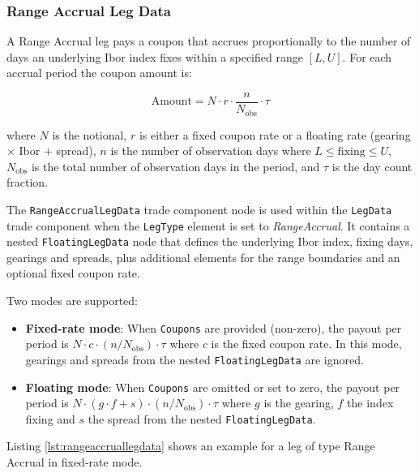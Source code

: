 \subsubsection{Range Accrual Leg Data}
\label{ss:rangeaccruallegdata}

A Range Accrual leg pays a coupon that accrues proportionally to the number of days an underlying Ibor index fixes
within a specified range $[L, U]$. For each accrual period the coupon amount is:

$$\text{Amount} = N \cdot r \cdot \frac{n}{N_{\text{obs}}} \cdot \tau$$

where $N$ is the notional, $r$ is either a fixed coupon rate or a floating rate (gearing $\times$ Ibor $+$ spread),
$n$ is the number of observation days where $L \leq \text{fixing} \leq U$, $N_{\text{obs}}$ is the total number of
observation days in the period, and $\tau$ is the day count fraction.

The \lstinline!RangeAccrualLegData! trade component node is used within the \lstinline!LegData! trade component when the
\lstinline!LegType! element is set to \emph{RangeAccrual}. It contains a nested \lstinline!FloatingLegData! node that
defines the underlying Ibor index, fixing days, gearings and spreads, plus additional elements for the range boundaries
and an optional fixed coupon rate.

Two modes are supported:
\begin{itemize}
\item \textbf{Fixed-rate mode}: When \lstinline!Coupons! are provided (non-zero), the payout per period is
  $N \cdot c \cdot (n / N_{\text{obs}}) \cdot \tau$ where $c$ is the fixed coupon rate. In this mode, gearings and
  spreads from the nested \lstinline!FloatingLegData! are ignored.
\item \textbf{Floating mode}: When \lstinline!Coupons! are omitted or set to zero, the payout per period is
  $N \cdot (g \cdot f + s) \cdot (n / N_{\text{obs}}) \cdot \tau$ where $g$ is the gearing, $f$ the index fixing and
  $s$ the spread from the nested \lstinline!FloatingLegData!.
\end{itemize}

Listing \ref{lst:rangeaccruallegdata} shows an example for a leg of type Range Accrual in fixed-rate mode.

